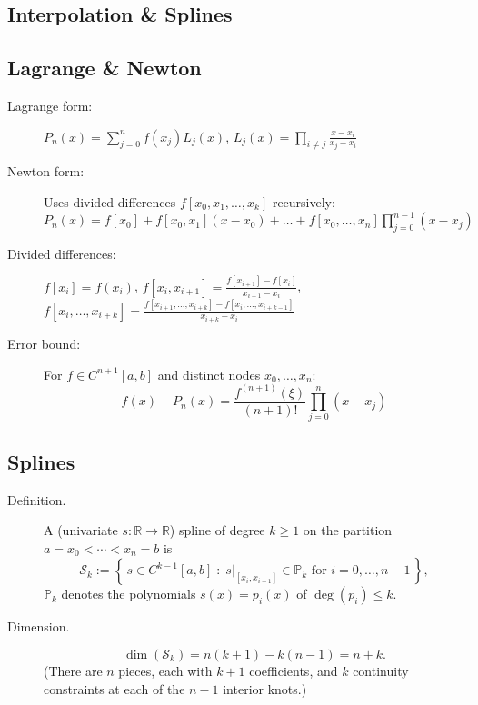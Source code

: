 \documentclass[a4paper,10pt,landscape]{article}
\newcommand{\R}{\mathbb{R}}
\begin{document}
\begin{multicols*}{3}
    \section*{Interpolation \& Splines}
    \subsection*{Lagrange \& Newton}
    \begin{description}
        \item[Lagrange form:] $P_n(x) = \sum_{j=0}^n f(x_j)L_j(x)$, $L_j(x) = \prod_{i\neq j}\frac{x-x_i}{x_j-x_i}$
        \item[Newton form:] Uses divided differences $f[x_0,x_1,\ldots,x_k]$ recursively: $P_n(x) = f[x_0] + f[x_0,x_1](x-x_0) + \ldots + f[x_0,\ldots,x_n]\prod_{j=0}^{n-1}(x-x_j)$
        \item[Divided differences:] $f[x_i] = f(x_i)$, $f[x_i,x_{i+1}] = \frac{f[x_{i+1}]-f[x_i]}{x_{i+1}-x_i}$, $f[x_i,\ldots,x_{i+k}] = \frac{f[x_{i+1},\ldots,x_{i+k}] - f[x_i,\ldots,x_{i+k-1}]}{x_{i+k}-x_i}$
        \item[Error bound:] For $f \in C^{n+1}[a,b]$ and distinct nodes $x_0,\ldots,x_n$:
              \[f(x) - P_n(x) = \frac{f^{(n+1)}(\xi)}{(n+1)!}\prod_{j=0}^n(x-x_j)\]
    \end{description}

    \subsection*{Splines}
    \begin{description}
        \item[Definition.] A (univariate $s: \R \to \R$) spline of degree $k\ge 1$ on the partition $a=x_0<\cdots<x_n=b$ is
              \[
                  \mathcal{S}_k := \left\{\, s\in C^{k-1}[a,b] \;:\; s|_{[x_i,x_{i+1}]} \in \mathbb{P}_k \text{ for } i=0,\ldots,n-1 \,\right\},
              \]
              $\mathbb{P}_k$ denotes the polynomials $s(x) = p_i(x)$ of $\deg(p_i) \le k$.

        \item[Dimension.]
              \[
                  \dim(\mathcal{S}_k) = n(k+1) - k(n-1) = n + k.
              \]
              (There are $n$ pieces, each with $k+1$ coefficients, and $k$ continuity constraints at each of the $n-1$ interior knots.)


\end{description}
\end{multicols*}
\end{document}
